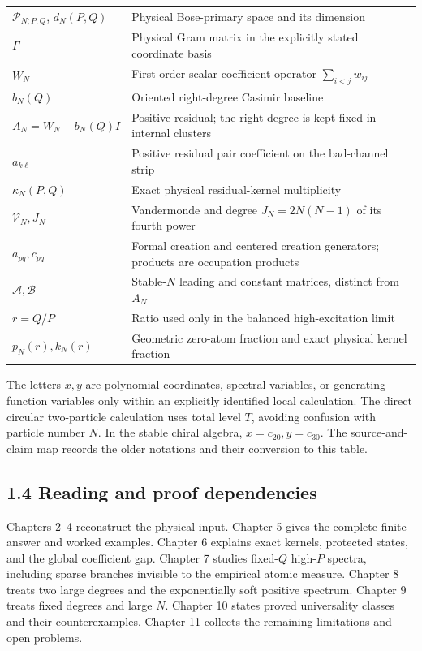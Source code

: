 \documentclass[a4paper,11pt]{article}
\numberwithin{equation}{section}
\begin{document}
\begin{longtable}[]{@{}
  >{\raggedright\arraybackslash}p{}
  >{\raggedright\arraybackslash}p{}@{}}
\(\mathcal P_{N;P,Q}\), \(d_N(P,Q)\) & Physical Bose-primary space and its dimension \\
\(\Gamma\) & Physical Gram matrix in the explicitly stated coordinate basis \\
\(W_N\) & First-order scalar coefficient operator \(\sum_{i<j}w_{ij}\) \\
\(b_N(Q)\) & Oriented right-degree Casimir baseline \\
\(A_N=W_N-b_N(Q)I\) & Positive residual; the right degree is kept fixed in internal clusters \\
\(a_{k\ell}\) & Positive residual pair coefficient on the bad-channel strip \\
\(\kappa_N(P,Q)\) & Exact physical residual-kernel multiplicity \\
\(\mathcal V_N,J_N\) & Vandermonde and degree \(J_N=2N(N-1)\) of its fourth power \\
\(a_{pq},c_{pq}\) & Formal creation and centered creation generators; products are occupation products \\
\(\mathscr A,\mathscr B\) & Stable-\(N\) leading and constant matrices, distinct from \(A_N\) \\
\(r=Q/P\) & Ratio used only in the balanced high-excitation limit \\
\(p_N(r),k_N(r)\) & Geometric zero-atom fraction and exact physical kernel fraction \\
\end{longtable}

The letters \(x,y\) are polynomial coordinates, spectral variables, or generating-function variables only within an explicitly identified local calculation. The direct circular two-particle calculation uses total level \(T\), avoiding confusion with particle number \(N\). In the stable chiral algebra, \(x=c_{20},y=c_{30}\). The source-and-claim map records the older notations and their conversion to this table.

\hypertarget{reading-and-proof-dependencies}{%
\subsection{1.4 Reading and proof dependencies}\label{reading-and-proof-dependencies}}

Chapters 2--4 reconstruct the physical input. Chapter 5 gives the complete finite answer and worked examples. Chapter 6 explains exact kernels, protected states, and the global coefficient gap. Chapter 7 studies fixed-\(Q\) high-\(P\) spectra, including sparse branches invisible to the empirical atomic measure. Chapter 8 treats two large degrees and the exponentially soft positive spectrum. Chapter 9 treats fixed degrees and large \(N\). Chapter 10 states proved universality classes and their counterexamples. Chapter 11 collects the remaining limitations and open problems.
\end{document}
